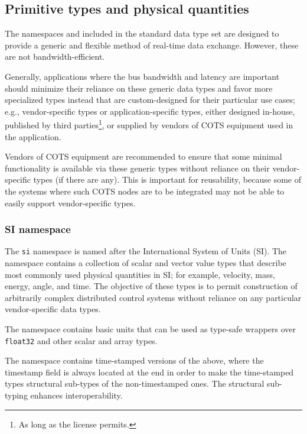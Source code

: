 
\subsection{Primitive types and physical quantities}

The namespaces  and 
included in the standard data type set are designed to provide a generic and flexible
method of real-time data exchange. However, these are not bandwidth-efficient.

Generally, applications where the bus bandwidth and latency are important should minimize their reliance
on these generic data types and favor more specialized types instead that are custom-designed for their
particular use cases; e.g., vendor-specific types or application-specific types, either
designed in-house, published by third parties\footnote{As long as the license permits.}, or supplied by
vendors of COTS equipment used in the application.

Vendors of COTS equipment are recommended to ensure that some minimal functionality is available
via these generic types without reliance on their vendor-specific types (if there are any).
This is important for reusability, because some of the systems where such COTS nodes are
to be integrated may not be able to easily support vendor-specific types.

\subsubsection{SI namespace}\label{sec:application_functions_si}

The \verb|si| namespace is named after the International System of Units (SI).
The namespace contains a collection of scalar and vector value types that describe most commonly used
physical quantities in SI; for example, velocity, mass, energy, angle, and time.
The objective of these types is to permit construction of arbitrarily complex distributed control systems without
reliance on any particular vendor-specific data types.

The namespace  contains basic units that can be used as type-safe wrappers
over \verb|float32| and other scalar and array types.

The namespace  contains time-stamped versions of the above,
where the timestamp field is always located at the end in order to make the time-stamped types
structural sub-types of the non-timestamped ones.
The structural sub-typing enhances interoperability.


